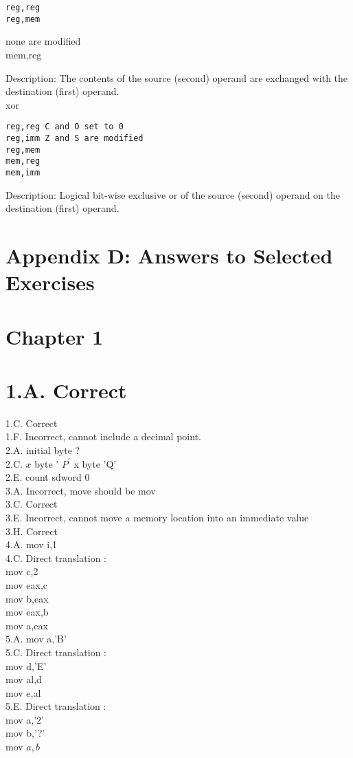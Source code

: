 \documentclass[10pt]{article}
\begin{document}
\begin{verbatim}
reg,reg
reg,mem
\end{verbatim}

none are modified\\
mem,reg

Description: The contents of the source (second) operand are exchanged with the destination (first) operand.\\
xor

\begin{verbatim}
reg,reg C and O set to 0
reg,imm Z and S are modified
reg,mem
mem,reg
mem,imm
\end{verbatim}

Description: Logical bit-wise exclusive or of the source (second) operand on the destination (first) operand.

\section*{Appendix D: Answers to Selected Exercises}
\section*{Chapter 1}
\section*{1.A. Correct}
1.C. Correct\\
1.F. Incorrect, cannot include a decimal point.\\
2.A. initial byte ?\\
2.C. $x$ byte ' $P^{\prime}$ x byte 'Q'\\
2.E. count sdword 0\\
3.A. Incorrect, move should be mov\\
3.C. Correct\\
3.E. Incorrect, cannot move a memory location into an immediate value\\
3.H. Correct\\
4.A. mov i,1\\
4.C. Direct translation :\\
mov c,2\\
mov eax,c\\
mov b,eax\\
mov eax,b\\
mov a,eax\\
5.A. mov a,'B'\\
5.C. Direct translation :\\
mov d,'E'\\
mov al,d\\
mov e,al\\
5.E. Direct translation :\\
mov a,'2'\\
mov b,'?'\\
mov $a, b$
\end{document}
